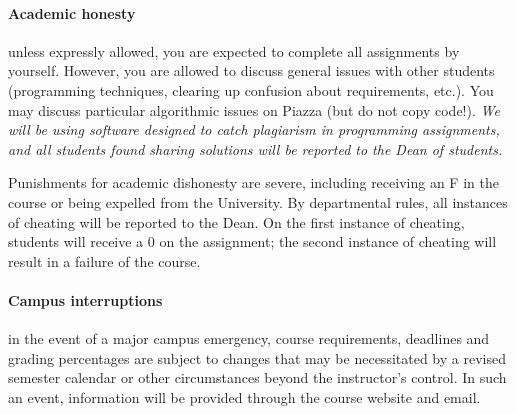 \documentclass{article}
\begin{document}
\paragraph{Academic honesty} unless expressly allowed, you are expected to complete all
assignments by yourself. However, you are allowed to discuss general issues with other
students (programming techniques, clearing up confusion about requirements, etc.).
You may discuss particular algorithmic issues on Piazza (but do not copy code!). {\em We will
be using software designed to catch plagiarism in programming assignments, and all
students found sharing solutions will be reported to the Dean of students.}

Punishments for academic dishonesty are severe, including receiving an F in the course or being expelled from the University. By departmental rules, all instances of cheating will be reported to the Dean. On the first instance of cheating, students will receive a 0 on the assignment; the second instance of cheating will result in a failure of the course. 

\paragraph{Campus interruptions} in the event of a major campus emergency, course requirements, deadlines and grading percentages are subject to changes that may be necessitated by a revised semester calendar or other circumstances beyond the instructor's control. In such an event, information will be provided through the course website and email.
\end{document}

